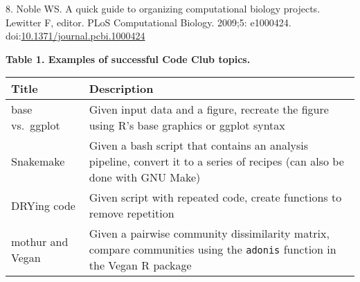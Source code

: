 \documentclass[11pt,]{article}
\begin{document}
\hypertarget{ref-Noble2009}{}
8. Noble WS. A quick guide to organizing computational biology projects.
Lewitter F, editor. PLoS Computational Biology. 2009;5: e1000424.
doi:\href{https://doi.org/10.1371/journal.pcbi.1000424}{10.1371/journal.pcbi.1000424}

\newpage

\textbf{Table 1. Examples of successful Code Club topics.}

\begin{longtable}[]{@{}ll@{}}
\toprule
\begin{minipage}[b]{0.24\columnwidth}\raggedright\strut
\textbf{Title}\strut
\end{minipage} & \begin{minipage}[b]{0.61\columnwidth}\raggedright\strut
\textbf{Description}\strut
\end{minipage}\tabularnewline
\midrule
\endhead
\begin{minipage}[t]{0.24\columnwidth}\raggedright\strut
base vs.~ggplot\strut
\end{minipage} & \begin{minipage}[t]{0.61\columnwidth}\raggedright\strut
Given input data and a figure, recreate the figure using R's base
graphics or ggplot syntax\strut
\end{minipage}\tabularnewline
\begin{minipage}[t]{0.24\columnwidth}\raggedright\strut
Snakemake\strut
\end{minipage} & \begin{minipage}[t]{0.61\columnwidth}\raggedright\strut
Given a bash script that contains an analysis pipeline, convert it to a
series of recipes (can also be done with GNU Make)\strut
\end{minipage}\tabularnewline
\begin{minipage}[t]{0.24\columnwidth}\raggedright\strut
DRYing code\strut
\end{minipage} & \begin{minipage}[t]{0.61\columnwidth}\raggedright\strut
Given script with repeated code, create functions to remove
repetition\strut
\end{minipage}\tabularnewline
\begin{minipage}[t]{0.24\columnwidth}\raggedright\strut
mothur and Vegan\strut
\end{minipage} & \begin{minipage}[t]{0.61\columnwidth}\raggedright\strut
Given a pairwise community dissimilarity matrix, compare communities
using the \texttt{adonis} function in the Vegan R package\strut

\end{minipage}
\end{longtable}
\end{document}
